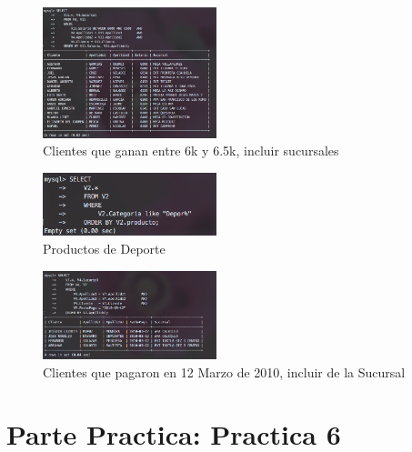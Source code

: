 \documentclass[12pt, fleqn]{article}                             %
\begin{document}
        \begin{figure}[ht!]
            \centering
            \includegraphics[width=0.45\textwidth]{BD5Reporte2Parte3}
            \caption{Clientes que ganan entre 6k y 6.5k, incluir sucursales}
        \end{figure}


        \begin{figure}[ht!]
            \centering
            \includegraphics[width=0.45\textwidth]{BD5Reporte2Parte4}
            \caption{Productos de Deporte}
        \end{figure}

        \begin{figure}[ht!]
            \centering
            \includegraphics[width=0.45\textwidth]{BD5Reporte2Parte5}
            \caption{Clientes que pagaron en 12 Marzo de 2010, incluir de la Sucursal}
        \end{figure}







\clearpage
\section{Parte Practica: Practica 6}
\end{document}

